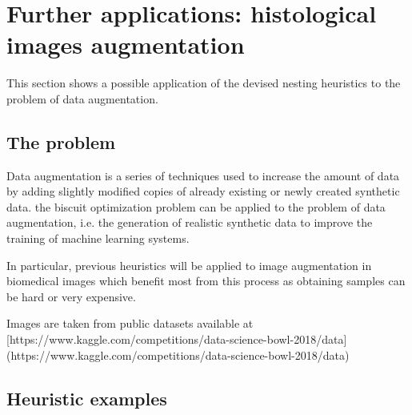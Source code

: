 
\section{Further applications: histological images augmentation}
This section shows a possible application of the devised nesting heuristics to the problem of data augmentation.

\subsection{The problem}
Data augmentation is a series of techniques used to increase the amount of data by adding slightly modified copies of already existing or newly created synthetic data.
the biscuit optimization problem can be applied to the problem of data augmentation, i.e. the generation of realistic synthetic data to improve the training of machine learning systems.

In particular, previous heuristics will be applied to image augmentation in biomedical images which benefit most from this process as obtaining samples can be hard or very expensive.

Images are taken from public datasets available at [https://www.kaggle.com/competitions/data-science-bowl-2018/data](https://www.kaggle.com/competitions/data-science-bowl-2018/data)

\subsection{Heuristic examples}



